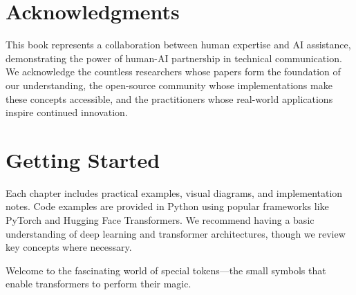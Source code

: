 \section*{Acknowledgments}

This book represents a collaboration between human expertise and AI assistance, demonstrating the power of human-AI partnership in technical communication. We acknowledge the countless researchers whose papers form the foundation of our understanding, the open-source community whose implementations make these concepts accessible, and the practitioners whose real-world applications inspire continued innovation.

\section*{Getting Started}

Each chapter includes practical examples, visual diagrams, and implementation notes. Code examples are provided in Python using popular frameworks like PyTorch and Hugging Face Transformers. We recommend having a basic understanding of deep learning and transformer architectures, though we review key concepts where necessary.

Welcome to the fascinating world of special tokens---the small symbols that enable transformers to perform their magic.
\begin{comment}
Feedback: The final sentence is a bit generic. A more specific and exciting closing could be: "Welcome to the world of special tokens—the small but mighty components that unlock the true potential of the transformer architecture."
\end{comment}
